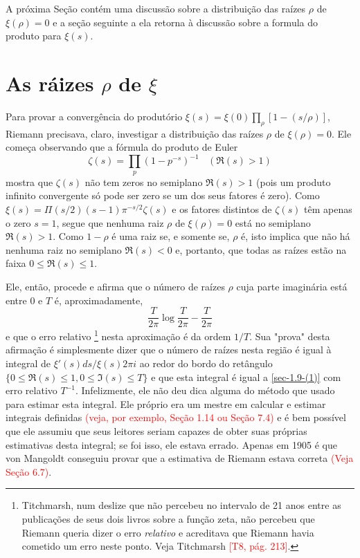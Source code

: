     A próxima Seção contém uma discussão sobre a distribuição das raízes $\rho$ de $\xi(\rho) = 0$ e a seção seguinte a ela retorna à discussão sobre a formula do produto para $\xi(s)$.
    
    
    \section{As ráizes $\rho$ de $\xi$}
    
    
    Para provar a convergência do produtório $\xi(s) = \xi(0) \prod_{\rho} [1 - (s/\rho)]$, Riemann precisava, claro, investigar a distribuição das raízes $\rho$ de $\xi(\rho) = 0$. Ele começa observando que a fórmula do produto de Euler 
    \begin{equation*}
        \zeta(s) = \prod_{p} (1 - p^{-s})^{-1} \ \ \ \ (\Re(s) > 1) 
    \end{equation*}
    mostra que $\zeta(s)$ não tem zeros no semiplano $\Re(s) > 1$ (pois um produto infinito convergente só pode ser zero se um dos seus fatores é zero). Como $\xi(s) = \Pi(s/2) (s-1) \pi^{-s/2} \zeta(s)$ e os fatores distintos de $\zeta(s)$ têm apenas o zero $s = 1$, segue que nenhuma raiz $\rho$ de $\xi(\rho) = 0$ está no semiplano $\Re(s) > 1$. Como $1 - \rho$ é uma raiz se, e somente se, $\rho$ é, isto implica que não há nenhuma raiz no semiplano $\Re(s) < 0$ e, portanto, que todas as raízes estão na faixa $0 \leq \Re(s) \leq 1$.
    
    Ele, então, procede e afirma que o número de raízes $\rho$ cuja parte imaginária está entre 0 e $T$ é, aproximadamente,
    \begin{equation}
        \label{sec-1.9-(1)}
        \frac{T}{2 \pi} \log \frac{T}{2 \pi} - \frac{T}{2 \pi}
    \end{equation}
    e que o erro relativo
    \footnote{Titchmarsh, num deslize que não percebeu no intervalo de 21 anos entre as publicações de seus dois livros sobre a função zeta, não percebeu que Riemann queria dizer o erro \textit{relativo} e acreditava que Riemann havia cometido um erro neste ponto. Veja Titchmarsh \textcolor{red}{[T8, pág. 213]}.}
    nesta aproximação é da ordem $1/T$. Sua "prova" desta afirmação é simplesmente dizer que o número de raízes nesta região é igual à integral de $\xi'(s) ds / \xi(s) 2\pi i$ ao redor do bordo do retângulo $\{0 \leq \Re(s) \leq 1, 0 \leq \Im(s) \leq T \}$ e que esta integral é igual a \eqref{sec-1.9-(1)} com erro relativo $T^{-1}$. Infelizmente, ele não deu dica alguma do método que usado para estimar esta integral. Ele próprio era um mestre em calcular e estimar integrais definidas \textcolor{red}{(veja, por exemplo, Seção 1.14 ou Seção 7.4)} e é bem possível que ele assumiu que seus leitores seriam capazes de obter suas próprias estimativas desta integral; se foi isso, ele estava errado. Apenas em 1905 é que von Mangoldt conseguiu provar que a estimativa de Riemann estava correta \textcolor{red}{(Veja Seção 6.7)}.
    
